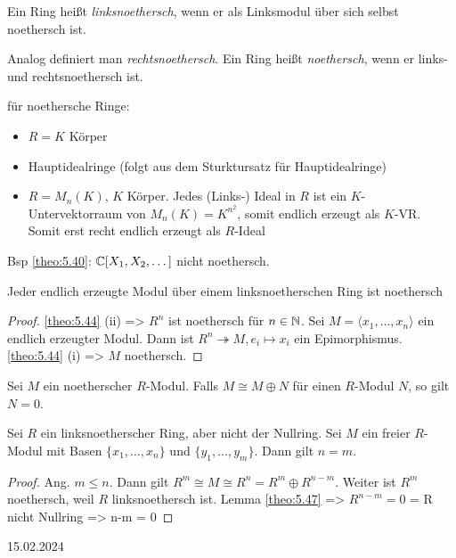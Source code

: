 \documentclass[../main.tex]{subfiles}
\begin{document}
\begin{definition}
    Ein Ring heißt \emph{linksnoethersch}, wenn er als Linksmodul über sich selbst noethersch ist.

    Analog definiert man \emph{rechtsnoethersch}.
    Ein Ring heißt \emph{noethersch}, wenn er links- und rechtsnoethersch ist.
\end{definition}
\begin{example*}
    für noethersche Ringe:
    \begin{itemize}
        \item $R=K$ Körper
        \item Hauptidealringe (folgt aus dem Sturktursatz für Hauptidealringe)
        \item $R=M_n(K)$, $K$ Körper. Jedes (Links-) Ideal in $R$ ist ein $K$-Untervektorraum von $M_n(K) = K^{n^2}$, somit endlich erzeugt als $K$-VR. Somit erst recht endlich erzeugt als $R$-Ideal
    \end{itemize}
    Bsp \ref{theo:5.40}: $\mathbb{C}[X_1,X_2,\dots]$ nicht noethersch.
\end{example*}
\begin{lemma}\label{theo:5.46}
    Jeder endlich erzeugte Modul über einem linksnoetherschen Ring ist noethersch
\end{lemma}
\begin{proof}
    \ref{theo:5.44} (ii) => $R^n$ ist noethersch für $n\in \mathbb{N}$.
    Sei $M=\langle x_1, \dots, x_n\rangle$ ein endlich erzeugter Modul. Dann ist $R^n \twoheadrightarrow M, e_i\mapsto x_i$ ein Epimorphismus.
    \ref{theo:5.44} (i) => $M$ noethersch.
\end{proof}
\begin{lemma}\label{theo:5.47}
    Sei $M$ ein noetherscher $R$-Modul. Falls $M\cong M\oplus N$ für einen $R$-Modul $N$, so gilt $N=0$.
\end{lemma}
\begin{theorem}
    Sei $R$ ein linksnoetherscher Ring, aber nicht der Nullring.
    Sei $M$ ein freier $R$-Modul mit Basen $\{x_1,\dots,x_n\}$ und $\{y_1,\dots,y_m\}$. Dann gilt $n=m$.
\end{theorem}

\begin{proof}
    Ang. $m\leq n$. Dann gilt $R^m\cong M\cong R^n = R^m \oplus R^{n-m}$. Weiter ist $R^m$ noethersch, weil $R$ linksnoethersch ist.
    Lemma \ref{theo:5.47} => $R^{n-m} = 0$  = R nicht Nullring => n-m = 0 
\end{proof}

\begin{flushright}
    15.02.2024
\end{flushright}
\end{document}
